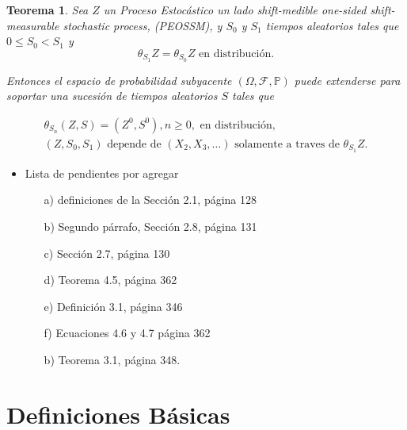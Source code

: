 \documentclass{article}
\newtheorem{Teo}{Teorema}
\newcommand{\prob}{\mathbb{P}}
\begin{document}
\begin{Teo}
Sea $Z$ un Proceso Estoc\'astico un lado shift-medible \textit{one-sided shift-measurable stochastic process}, (PEOSSM),
y $S_{0}$ y $S_{1}$ tiempos aleatorios tales que $0\leq S_{0}<S_{1}$ y
\begin{equation}
\theta_{S_{1}}Z=\theta_{S_{0}}Z\textrm{ en distribuci\'on}.
\end{equation}

Entonces el espacio de probabilidad subyacente $\left(\Omega,\mathcal{F},\prob\right)$ puede extenderse para soportar una sucesi\'on de tiempos aleatorios $S$ tales que

\begin{eqnarray}
\theta_{S_{n}}\left(Z,S\right)=\left(Z^{0},S^{0}\right),n\geq0,\textrm{ en distribuci\'on},\\
\left(Z,S_{0},S_{1}\right)\textrm{ depende de }\left(X_{2},X_{3},\ldots\right)\textrm{ solamente a traves de }\theta_{S_{1}}Z.
\end{eqnarray}
\end{Teo}

\begin{itemize}
\item Lista de pendientes por agregar
\begin{itemize}
\item[a)] definiciones de la Secci\'on 2.1, p\'agina 128

\item[b)] Segundo p\'arrafo, Secci\'on 2.8, p\'agina 131

\item[c)] Secci\'on 2.7, p\'agina 130

\item[d)] Teorema 4.5, p\'agina 362

\item[e)] Definici\'on 3.1,  p\'agina 346

\item[f)] Ecuaciones 4.6 y 4.7 p\'agina 362

\item[b)] Teorema 3.1, p\'agina 348.
\end{itemize}
\end{itemize}
\section{Definiciones  B\'asicas}
\end{document}
